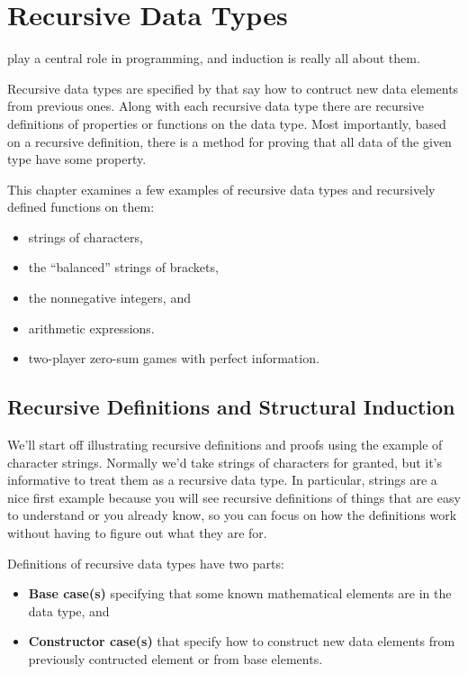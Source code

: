 
\chapter{Recursive Data Types}\label{recursive_data_chapter}

 play a central role in programming, and
induction is really all about them.

Recursive data types are specified by  that
say how to contruct new data elements from previous ones.  Along with each
recursive data type there are recursive definitions of properties or
functions on the data type.  Most importantly, based on a recursive
definition, there is a  method for proving that
all data of the given type have some property.

This chapter examines a few examples of recursive data types and
recursively defined functions on them:
\begin{itemize}
\item strings of characters,
\item the ``balanced'' strings of brackets,
\item the nonnegative integers, and
\item arithmetic expressions.
\item two-player zero-sum games with perfect information.
\end{itemize}

\section{Recursive Definitions and Structural Induction}

We'll start off illustrating recursive definitions and proofs using the
example of character strings.  Normally we'd take strings of characters
for granted, but it's informative to treat them as a recursive data type.
In particular, strings are a nice first example because you will see
recursive definitions of things that are easy to understand or you already
know, so you can focus on how the definitions work without having to
figure out what they are for.

Definitions of recursive data types have two parts:
\begin{itemize}
\item \textbf{Base case(s)} specifying that some known mathematical elements are
  in the data type, and

\item \textbf{Constructor case(s)} that specify how to construct new data
  elements from previously contructed element or from base elements.
\end{itemize}

